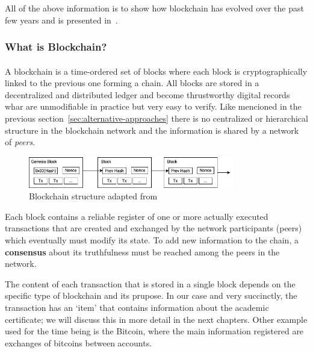 All of the above information is to show how blockchain has evolved over the past few years and is presented in~\cite{TRIPATHI2023100344}. %

\subsubsection*{What is Blockchain?}\label{subsubsec:what-is-the-blockchain}
\paragraph{}

A blockchain is a time-ordered set of blocks where each block is cryptographically linked to the previous one forming a chain. All blocks are stored in a decentralized and distributed ledger and become
thrustworthy digital records whar are unmodifiable in practice but very easy to verify. Like mencioned in the previous section~\ref{sec:alternative-approaches} there is no centralized or hierarchical structure in the blockchain network
and the information is shared by a network of \textit{peers}.

\begin{figure}[h]\label{fig:blockchain}
    \begin{center}
        \includegraphics[width=0.8\textwidth]{assets/blockchain.png}
        \caption{Blockchain structure adapted from~\cite{nakamoto2008bitcoin}}
    \end{center}
\end{figure}

Each block contains a reliable register of one or more actually executed transactions that are created and exchanged by the network participants (peers) which eventually must modify
its state. To add new information to the chain, a \textbf{consensus} about its truthfulness must be reached among the peers in the network.

The content of each transaction that is stored in a single block depends on the specific type of blockchain and its prupose. In our case and very succinctly, the transaction has an `item' that contains information about
the academic certificate; we will discuss this in more detail in the next chapters. Other example used for the time being is the Bitcoin, where the main information registered are exchanges of
bitcoins between accounts.

